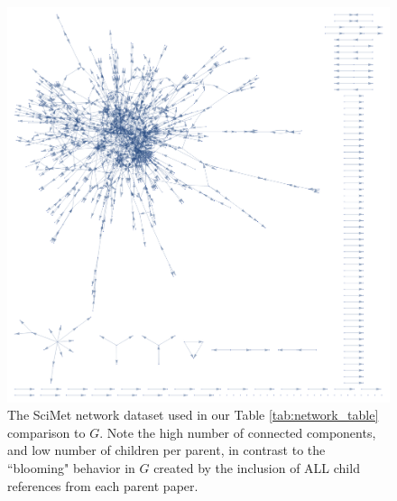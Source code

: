 \documentclass[12pt]{thesis}
\theoremstyle{plain}
\theoremstyle{definition}
\theoremstyle{remark}
\begin{document}
\begin{figure}[H]
\centering
\includegraphics[width=\textwidth]{display_sciMet.png}
\caption{The SciMet network dataset used in our Table \ref{tab:network_table} comparison to $G$. Note the high number of connected components, and low number of children per parent, in contrast to the ``blooming" behavior in $G$ created by the inclusion of ALL child references from each parent paper.}
\label{fig:sciMet}
\end{figure}
\end{document}
